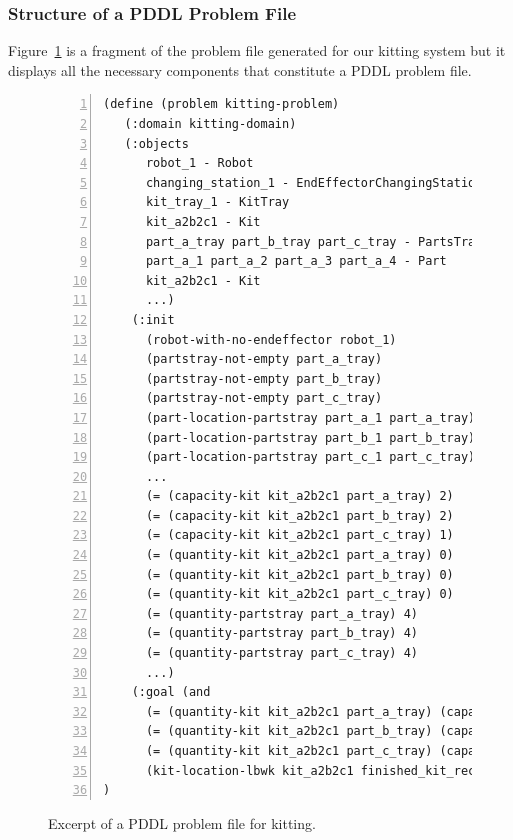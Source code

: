 \subsubsection{Structure of a PDDL Problem File}
Figure~\ref{fig:problem} is a fragment of the problem file generated for our kitting system but it displays all the necessary components that constitute a PDDL problem file.

\begin{figure}[t!h!]
\begin{minipage}{.7\paperwidth}
\begin{list}{}{\setlength{\leftmargin}{1em}}\item\small
\begin{Verbatim}[commandchars=\\\{\},fontsize=\scriptsize, numbers=left, numbersep=2pt]
(define (problem kitting-problem)
   (:domain kitting-domain)
   (:objects
      robot_1 - Robot
      changing_station_1 - EndEffectorChangingStation
      kit_tray_1 - KitTray
      kit_a2b2c1 - Kit
      part_a_tray part_b_tray part_c_tray - PartsTray
      part_a_1 part_a_2 part_a_3 part_a_4 - Part
      kit_a2b2c1 - Kit
      ...)
    (:init
      (robot-with-no-endeffector robot_1)
      (partstray-not-empty part_a_tray)
      (partstray-not-empty part_b_tray)
      (partstray-not-empty part_c_tray)
      (part-location-partstray part_a_1 part_a_tray)
      (part-location-partstray part_b_1 part_b_tray)
      (part-location-partstray part_c_1 part_c_tray)
      ...
      (= (capacity-kit kit_a2b2c1 part_a_tray) 2)
      (= (capacity-kit kit_a2b2c1 part_b_tray) 2)
      (= (capacity-kit kit_a2b2c1 part_c_tray) 1)
      (= (quantity-kit kit_a2b2c1 part_a_tray) 0)
      (= (quantity-kit kit_a2b2c1 part_b_tray) 0)
      (= (quantity-kit kit_a2b2c1 part_c_tray) 0)
      (= (quantity-partstray part_a_tray) 4)
      (= (quantity-partstray part_b_tray) 4)
      (= (quantity-partstray part_c_tray) 4)
      ...)
    (:goal (and
      (= (quantity-kit kit_a2b2c1 part_a_tray) (capacity-kit kit_a2b2c1 part_a_tray))
      (= (quantity-kit kit_a2b2c1 part_b_tray) (capacity-kit kit_a2b2c1 part_b_tray))
      (= (quantity-kit kit_a2b2c1 part_c_tray) (capacity-kit kit_a2b2c1 part_c_tray))
      (kit-location-lbwk kit_a2b2c1 finished_kit_receiver))
)
\end{Verbatim}
\end{list}
\end{minipage}
\caption{Excerpt of a PDDL problem file for kitting.}
\label{fig:problem}
\end{figure}

